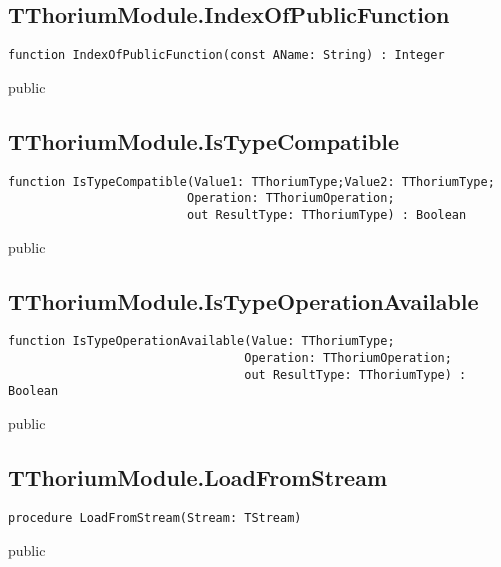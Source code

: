 \subsection{TThoriumModule.IndexOfPublicFunction}
\label{thoriumcore:thorium:tthoriummodule:indexofpublicfunction}
\begin{FPCList}
\Synopsis
\Declaration 

\begin{verbatim}
function IndexOfPublicFunction(const AName: String) : Integer
\end{verbatim}
\Visibility
public
\Description
\Errors
\end{FPCList}
\subsection{TThoriumModule.IsTypeCompatible}
\label{thoriumcore:thorium:tthoriummodule:istypecompatible}
\begin{FPCList}
\Synopsis
\Declaration 

\begin{verbatim}
function IsTypeCompatible(Value1: TThoriumType;Value2: TThoriumType;
                         Operation: TThoriumOperation;
                         out ResultType: TThoriumType) : Boolean
\end{verbatim}
\Visibility
public
\Description
\Errors
\end{FPCList}
\subsection{TThoriumModule.IsTypeOperationAvailable}
\label{thoriumcore:thorium:tthoriummodule:istypeoperationavailable}
\begin{FPCList}
\Synopsis
\Declaration 

\begin{verbatim}
function IsTypeOperationAvailable(Value: TThoriumType;
                                 Operation: TThoriumOperation;
                                 out ResultType: TThoriumType) : Boolean
\end{verbatim}
\Visibility
public
\Description
\Errors
\end{FPCList}
\subsection{TThoriumModule.LoadFromStream}
\label{thoriumcore:thorium:tthoriummodule:loadfromstream}
\begin{FPCList}
\Synopsis
\Declaration 

\begin{verbatim}
procedure LoadFromStream(Stream: TStream)
\end{verbatim}
\Visibility
public
\Description
\Errors
\end{FPCList}
